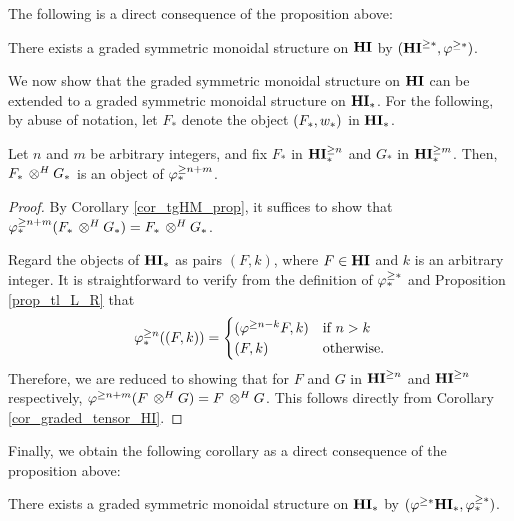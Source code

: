 The following is a direct consequence of the proposition above:

\begin{cor}\label{cor_graded_tensor_HI}
There exists a graded symmetric monoidal structure on $\mathbf{HI}$ by
$(\mathbf{HI}^{\geq *}, \varphi^{\geq *})$.
\end{cor}

We now show that the graded symmetric monoidal structure on $\mathbf{HI}$
can be extended to a graded symmetric monoidal structure on $\mathbf{HI}_*$.
For the following, by abuse of notation, let $F_*$ denote the 
object $(F_*, w_*)$ in $\mathbf{HI}_*$.

\begin{prop}\label{prop_graded_mon_struct_HM}
Let $n$ and $m$ be arbitrary integers, and fix $F_*$ in $\mathbf{HI}_*^{\geq n}$ 
and $G_*$ in $\mathbf{HI}_*^{\geq m}$. Then, $F_* \,\otimes^H G_*$ is an object of 
$\varphi^{\geq n + m}_{*}$.
\end{prop}
\begin{proof}
By Corollary \ref{cor_tgHM_prop}, it suffices to show that $\varphi^{\geq n + m}_{*}(F_*
\,\otimes^H G_*) = F_* \,\otimes^H G_*$.

Regard the objects of $\mathbf{HI}_*$ as pairs $(F, k)$, where $F \in \mathbf{HI}$
and $k$ is an arbitrary integer. It is straightforward to 
verify from the definition of $\varphi^{\geq *}_{*}$ and Proposition \ref{prop_tl_L_R} 
that
\[
\varphi^{\geq n}_{*}((F, k)) = \begin{cases}
(\varphi^{\geq n - k}F, k) &\textrm{if }n > k\\
(F, k)             &\textrm{otherwise}.
\end{cases}
\]
Therefore, we are reduced to showing that for $F$ and $G$ in
$\mathbf{HI}^{\geq n}$ and $\mathbf{HI}^{\geq n}$ respectively, 
$\varphi^{\geq n + m}(F \,\otimes^H G) = F \,\otimes^H G$. This follows directly from 
Corollary \ref{cor_graded_tensor_HI}.
\end{proof}

Finally, we obtain the following corollary as a direct consequence
of the proposition above:

\begin{cor}\label{cor_graded_mon_struct_HM}
There exists a graded symmetric monoidal structure on $\mathbf{HI}_*$ by
$(\varphi^{\geq *}\mathbf{HI}_*, \varphi^{\geq *}_{*})$.
\end{cor}
